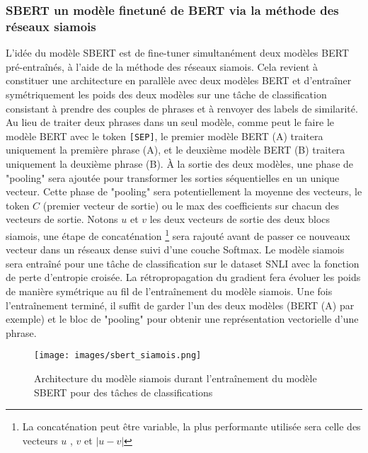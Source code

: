 \documentclass[12pt]{article}
\theoremstyle{definition}
\begin{document}
\subsubsection{SBERT un modèle finetuné de BERT via la méthode des réseaux siamois}
L’idée du modèle SBERT est de fine-tuner simultanément deux modèles BERT pré-entraînés, à l’aide de la méthode des réseaux siamois. Cela revient à constituer une architecture en parallèle avec deux modèles BERT et d'entraîner symétriquement les poids des deux modèles sur une tâche de classification consistant à prendre des couples de phrases et à renvoyer des labels de similarité. Au lieu de traiter deux phrases dans un seul modèle, comme peut le faire le modèle BERT avec le token \texttt{[SEP]}, le premier modèle BERT (A) traitera uniquement la première phrase (A), et le deuxième modèle BERT (B) traitera uniquement la deuxième phrase (B). À la sortie des deux modèles, une phase de "pooling" sera ajoutée pour transformer les sorties séquentielles en un unique vecteur. Cette phase de "pooling" sera potentiellement la moyenne des vecteurs, le token $C$ (premier vecteur de sortie) ou le max des coefficients sur chacun des vecteurs de sortie. Notons $u$ et $v$ les deux vecteurs de sortie des deux blocs siamois, une étape de concaténation \footnote{La concaténation peut être variable, la plus performante utilisée sera celle des vecteurs $u$ , $v$  et $|u-v|$ } sera rajouté avant de passer ce nouveaux vecteur dans un réseaux dense suivi d'une couche Softmax. Le modèle siamois sera entraîné pour une tâche de classification sur le dataset SNLI \cite{sts} avec la fonction de perte d'entropie croisée. La rétropropagation du gradient fera évoluer les poids de manière symétrique au fil de l’entraînement du modèle siamois. Une fois l’entraînement terminé, il suffit de garder l’un des deux modèles (BERT (A) par exemple) et le bloc de "pooling" pour obtenir une représentation vectorielle d'une phrase.

\begin{figure*}[!h]
	\centering
	\texttt{[image: images/sbert\_siamois.png]}
	\caption{Architecture du modèle siamois durant l'entraînement du modèle SBERT pour des tâches de classifications \cite{sbert}}
\end{figure*}
\end{document}
